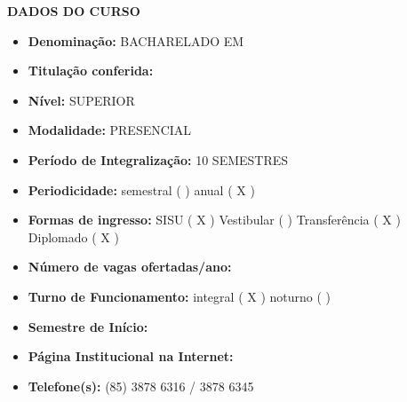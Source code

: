 \clearpage
\thispagestyle{empty}
\begin{center}
	\textbf{DADOS DO CURSO}
\end{center}

\vspace{0.5cm}

\begin{itemize}
	\item \textbf{Denominação:} \MakeUppercase{Bacharelado em \NOMEENG}
	\item \textbf{Titulação conferida:} \MakeUppercase{\NOMEEGRESSO}
	\item \textbf{Nível:} \MakeUppercase{SUPERIOR}
	\item \textbf{Modalidade:} \MakeUppercase{PRESENCIAL}
	\item \textbf{Período de Integralização:} \MakeUppercase{10 semestres}
	\item \textbf{Periodicidade: }{semestral (  )  anual ( X ) }
	\item \textbf{Formas de ingresso: }{SISU ( X )  Vestibular (  ) Transferência ( X ) Diplomado ( X ) }
	\item \textbf{Número de vagas ofertadas/ano: }{\NUMVAGAS}
	\item \textbf{Turno de Funcionamento: }{integral ( X ) noturno ( )}
	\item \textbf{Semestre de Início:} \MakeUppercase{\SEMESTRE}
	\item\textbf{Página Institucional na Internet:} 
	
	\web{\PAGINA}
	\item\textbf{Telefone(s):} (85) 3878 6316 / 3878 6345
	
	
	
	
\end{itemize}
